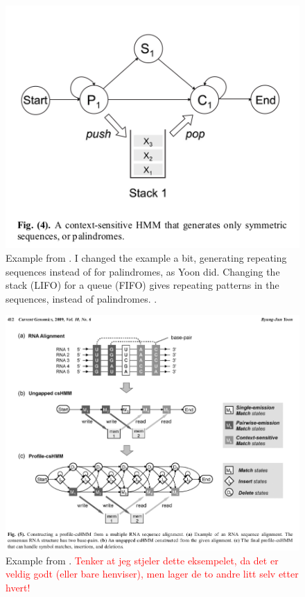 \documentclass{article}
\begin{document}
\begin{figure}
    \centering
    \includegraphics[width = \textwidth]{ExampleYooncsHMM.png}
    \caption{Example from \cite{Yoon2009}. I changed the example a bit, generating repeating sequences instead of for palindromes, as Yoon did.  Changing the stack (LIFO) for a queue (FIFO) gives repeating patterns in the sequences, instead of palindromes. .}
    \label{fig:Yoon2009ContextSensitiveHMMExample}
\end{figure}

\begin{figure}
    \centering
    \includegraphics[width = \textwidth]{contextSensHMMExampleYoon.png}
    \caption{Example from \cite{Yoon2009}. \textcolor{red}{Tenker at jeg stjeler dette eksempelet, da det er veldig godt (eller bare henviser), men lager de to andre litt selv etter hvert!}}
    \label{fig:Yoon2009ProfileContextSensitiveHMMExample}
\end{figure}
\end{document}
